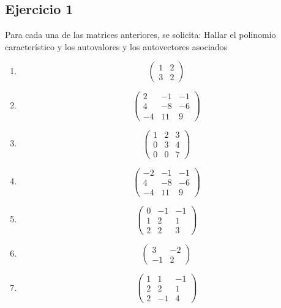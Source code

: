 \documentclass{article}
\begin{document}
\subsection{Ejercicio 1}
Para cada una de las matrices anteriores, se solicita:
Hallar el polinomio característico y los autovalores y los autovectores asociados
\begin{enumerate}[label=\textbf{\alph*)}]
    \item
    \[
    \begin{pmatrix}
        1 & 2\\
        3 & 2
    \end{pmatrix}
    \]

    \item
    \[
    \begin{pmatrix}
        2 & -1 & -1\\
        4 & -8 & -6\\
        -4 & 11 & 9
    \end{pmatrix}
    \]

    \item
    \[
    \begin{pmatrix}
        1 & 2 & 3\\
        0 & 3 & 4\\
        0 & 0 & 7
    \end{pmatrix}
    \]

    \item
    \[
    \begin{pmatrix}
        -2 & -1 & -1\\
        4 & -8 & -6\\
        -4 & 11 & 9
    \end{pmatrix}
    \]

    \item
    \[
    \begin{pmatrix}
        0 & -1 & -1\\
        1 & 2 & 1\\
        2 & 2 & 3
    \end{pmatrix}
    \]

    \item
    \[
    \begin{pmatrix}
        3 & -2\\
        -1 & 2
    \end{pmatrix}
    \]

    \item
    \[
    \begin{pmatrix}
        1 & 1 & -1\\
        2 & 2 & 1\\
        2 & -1 & 4
    \end{pmatrix}
    \]


\end{enumerate}
\end{document}
